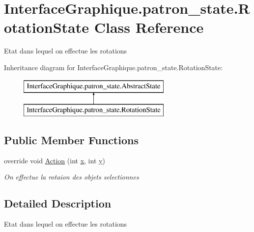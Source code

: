 \hypertarget{class_interface_graphique_1_1patron__state_1_1_rotation_state}{\section{Interface\-Graphique.\-patron\-\_\-state.\-Rotation\-State Class Reference}
\label{class_interface_graphique_1_1patron__state_1_1_rotation_state}
}


Etat dans lequel on effectue les rotations  


Inheritance diagram for Interface\-Graphique.\-patron\-\_\-state.\-Rotation\-State\-:\begin{figure}[H]
\begin{center}
\leavevmode
\includegraphics[height=2.000000cm]{class_interface_graphique_1_1patron__state_1_1_rotation_state}
\end{center}
\end{figure}
\subsection*{Public Member Functions}
\begin{DoxyCompactItemize}
\item 
override void \hyperlink{class_interface_graphique_1_1patron__state_1_1_rotation_state_aa115b089fcafb2b25b8a27f19b55ef31}{Action} (int \hyperlink{group__inf2990_ga6150e0515f7202e2fb518f7206ed97dc}{x}, int \hyperlink{group__inf2990_ga0a2f84ed7838f07779ae24c5a9086d33}{y})
\begin{DoxyCompactList}\small\item\em On effectue la rotaion des objets selectionnes \end{DoxyCompactList}\end{DoxyCompactItemize}


\subsection{Detailed Description}
Etat dans lequel on effectue les rotations 



